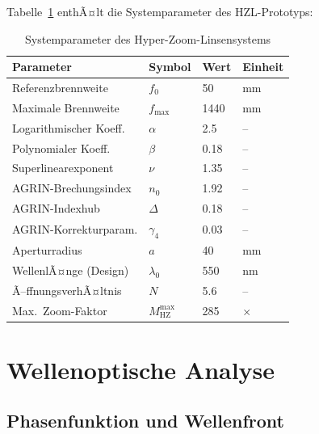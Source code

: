 ﻿\documentclass[12pt,a4paper]{article}
\theoremstyle{definition}
\newcommand{\HZ}{\mathrm{HZ}}
\begin{document}
	Tabelle~\ref{tab:params} enthÃ¤lt die Systemparameter des HZL-Prototyps:
	
	\begin{table}[H]
		\centering
		\caption{Systemparameter des Hyper-Zoom-Linsensystems}
		\label{tab:params}
		\begin{tabular}{llll}
			\toprule
			\textbf{Parameter} & \textbf{Symbol} & \textbf{Wert} & \textbf{Einheit}\\
			\midrule
			\rowcolor{blue!8}
			Referenzbrennweite        & $f_0$      & 50    & mm \\
			Maximale Brennweite       & $f_{\mathrm{max}}$   & 1440  & mm \\
			\rowcolor{blue!8}
			Logarithmischer Koeff.    & $\alpha$   & 2.5   & --  \\
			Polynomialer Koeff.       & $\beta$    & 0.18  & --  \\
			\rowcolor{blue!8}
			Superlinearexponent       & $\nu$      & 1.35  & --  \\
			AGRIN-Brechungsindex      & $n_0$      & 1.92  & --  \\
			\rowcolor{blue!8}
			AGRIN-Indexhub            & $\Delta$   & 0.18  & --  \\
			AGRIN-Korrekturparam.     & $\gamma_4$ & 0.03  & --  \\
			\rowcolor{blue!8}
			Aperturradius             & $a$        & 40    & mm  \\
			WellenlÃ¤nge (Design)      & $\lambda_0$& 550   & nm  \\
			\rowcolor{blue!8}
			Ã–ffnungsverhÃ¤ltnis        & $N$        & 5.6   & --  \\
			Max.\ Zoom-Faktor         & $M_{\HZ}^{\mathrm{max}}$& 285 & $\times$ \\
			\bottomrule
		\end{tabular}
	\end{table}
	
	\section{Wellenoptische Analyse}
	
	\subsection{Phasenfunktion und Wellenfront}
	
\end{document}
